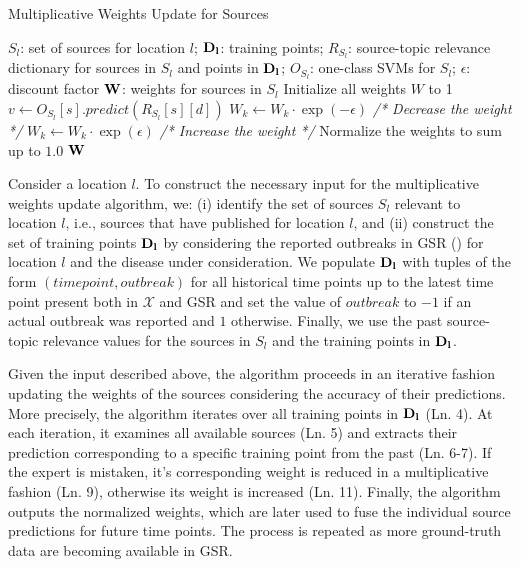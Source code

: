 \documentclass[twoside,leqno,twocolumn]{article}
\begin{document}
\vspace{-5pt}\begin{algorithm}[h]
\centering
\captionsetup{font=small}
\caption{Multiplicative Weights Update for Sources}
{\footnotesize \begin{algorithmic}[1]
 $S_l$: set of sources for location $l$; ${\bf D_l}$: training points; $R_{S_l}$: source-topic relevance dictionary for sources in $S_l$ and points in ${\bf D_l}$; $O_{S_l}$: one-class SVMs for $S_l$; $\epsilon$: discount factor
 $\bf{W}$: weights for sources in $S_l$
\STATE Initialize all weights $W$ to 1
	\STATE $v \leftarrow O_{S_l}[s].predict(R_{S_l}[s][d])$
		\STATE  $W_k \leftarrow W_k\cdot \exp(-\epsilon)$ {\em /* Decrease the weight */}
	\ELSE
		\STATE $W_k \leftarrow W_k\cdot \exp(\epsilon)$ {\em /* Increase the weight */}
	\ENDIF
	\ENDFOR	
	\STATE Normalize the weights to sum up to $1.0$
\ENDFOR
\RETURN ${\bf W}$
\end{algorithmic}}
\label{algo:mw}
\end{algorithm}
\vspace{-5pt}

Consider a location $l$. To construct the necessary input for the multiplicative weights update algorithm, we: (i) identify the set of sources $S_l$ relevant to location $l$, i.e., sources that have published for location $l$, and (ii) construct the set of training points  ${\bf D_l}$ by considering the reported outbreaks in GSR () for location $l$ and the disease under consideration. We populate ${\bf D_l}$ with tuples of the form $(time point, outbreak)$ for all historical time points up to the latest time point present both in $\mathcal{X}$ and GSR and set the value of $outbreak$ to $-1$ if an actual outbreak was reported and $1$ otherwise. Finally, we use the past source-topic relevance values for the sources in $S_l$ and the training points in ${\bf D_l}$.

Given the input described above, the algorithm proceeds in an iterative fashion updating the weights of the sources considering the accuracy of their predictions. More precisely, the algorithm iterates over all training points in ${\bf D_l}$ (Ln. 4).  At each iteration, it examines all available sources (Ln. 5) and extracts their prediction corresponding to a specific training point from the past (Ln. 6-7). If the expert is mistaken, it's corresponding weight is reduced in a multiplicative fashion (Ln. 9), otherwise its weight is increased (Ln. 11). Finally, the algorithm outputs the normalized weights, which are later used to fuse the individual source predictions for future time points. The process is repeated as more ground-truth data are becoming available in GSR.
\end{document}
